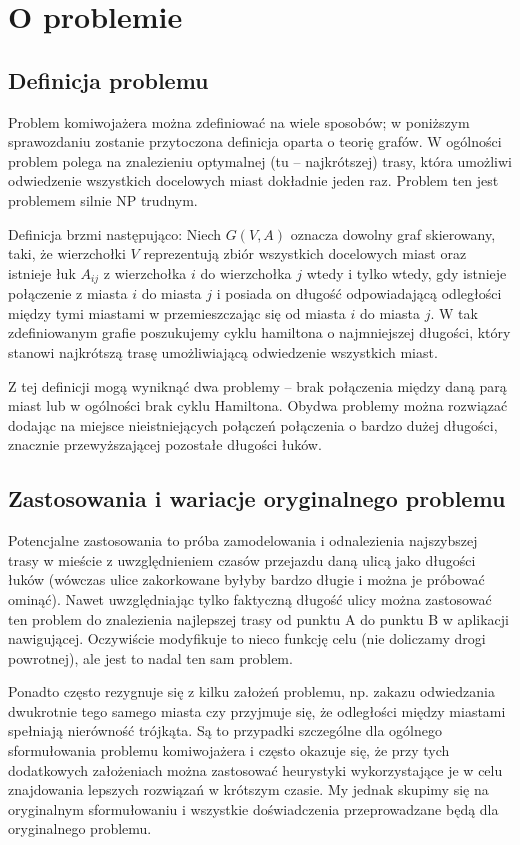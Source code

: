 \section{O problemie}
\subsection{Definicja problemu}
Problem komiwojażera można zdefiniować na wiele sposobów; w poniższym sprawozdaniu zostanie przytoczona definicja oparta o teorię grafów. W ogólności problem polega na znalezieniu optymalnej (tu -- najkrótszej) trasy, która umożliwi odwiedzenie wszystkich docelowych miast dokładnie jeden raz. Problem ten jest problemem silnie NP trudnym.

Definicja brzmi następująco: Niech $G(V,A)$ oznacza dowolny graf skierowany, taki, że wierzchołki $V$ reprezentują zbiór wszystkich docelowych miast oraz istnieje łuk $A_{ij}$ z wierzchołka $i$ do wierzchołka $j$ wtedy i tylko wtedy, gdy istnieje połączenie z miasta $i$ do miasta $j$ i posiada on długość odpowiadającą odległości między tymi miastami w przemieszczając się od miasta $i$ do miasta $j$. W tak zdefiniowanym grafie poszukujemy cyklu hamiltona o najmniejszej długości, który stanowi najkrótszą trasę umożliwiającą odwiedzenie wszystkich miast.

Z tej definicji mogą wyniknąć dwa problemy -- brak połączenia między daną parą miast lub w ogólności brak cyklu Hamiltona. Obydwa problemy można rozwiązać dodając na miejsce nieistniejących połączeń połączenia o bardzo dużej długości, znacznie przewyższającej pozostałe długości łuków.

\subsection{Zastosowania i wariacje oryginalnego problemu}
Potencjalne zastosowania to próba zamodelowania i odnalezienia najszybszej trasy w mieście z uwzględnieniem czasów przejazdu daną ulicą jako długości łuków (wówczas ulice zakorkowane byłyby bardzo długie i można je próbować ominąć). Nawet uwzględniając tylko faktyczną długość ulicy można zastosować ten problem do znalezienia najlepszej trasy od punktu A do punktu B w aplikacji nawigującej. Oczywiście modyfikuje to nieco funkcję celu (nie doliczamy drogi powrotnej), ale jest to nadal ten sam problem.

Ponadto często rezygnuje się z kilku założeń problemu, np. zakazu odwiedzania dwukrotnie tego samego miasta czy przyjmuje się, że odległości między miastami spełniają nierówność trójkąta. Są to przypadki szczególne dla ogólnego sformułowania problemu komiwojażera i często okazuje się, że przy tych dodatkowych założeniach można zastosować heurystyki wykorzystające je w celu znajdowania lepszych rozwiązań w krótszym czasie. My jednak skupimy się na oryginalnym sformułowaniu i wszystkie doświadczenia przeprowadzane będą dla oryginalnego problemu.